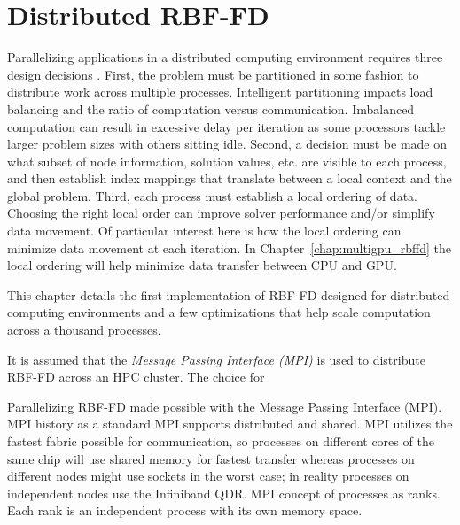 \documentclass{report}
\begin{document}
\fi


\chapter{Distributed RBF-FD}
\label{chap:distributed_rbffd}



Parallelizing applications in a distributed computing environment requires three
design decisions \cite{Saad2003}. First, the problem must be partitioned in some fashion to distribute work across multiple processes. Intelligent partitioning
impacts load balancing and the ratio of computation versus communication. Imbalanced computation can result in excessive delay per
iteration as some processors tackle larger problem sizes with others sitting idle. Second, a decision must be made on what subset of node information,
solution values, etc. are visible to each process, and then establish index mappings that translate between a local context and the global problem. Third, each process must establish a local ordering of data. Choosing the right local order can improve solver performance and/or simplify data movement. Of particular interest here is how the local ordering can minimize data movement at each iteration. In Chapter~\ref{chap:multigpu_rbffd} the local ordering will help minimize data transfer between CPU and GPU. 

This chapter details the first implementation of RBF-FD designed for distributed computing environments and a few optimizations that help scale computation across a thousand processes. 

It is assumed that the \emph{Message Passing Interface (MPI)} \cite{MPI} is used to distribute RBF-FD across an HPC cluster. The choice for 


Parallelizing RBF-FD made possible with the Message Passing Interface (MPI). 
MPI history as a standard
MPI supports distributed and shared. 
MPI utilizes the fastest fabric possible for communication, so processes on different cores of the same chip will use shared memory for fastest transfer whereas processes on different nodes might use sockets in the worst case; in reality processes on independent nodes use the Infiniband QDR. 
MPI concept of processes as ranks. Each rank is an independent process with its own memory space. 


\end{document}
